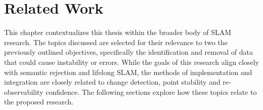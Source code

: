 \section{Related Work}
\label{sec:related_work}

This chapter contextualizes this thesis within the broader body of SLAM research. The topics discussed are selected for their relevance to two  the previously outlined objectives, specifically the identification and removal of data that could cause instability or errors. While the goals of this research align closely with semantic rejection and lifelong SLAM, the methods of implementation and integration are closely related to change detection, point stability and re-observability confidence. The following sections explore how these topics relate to the proposed research.

% 